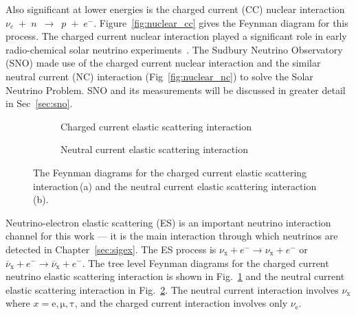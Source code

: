 Also significant at lower energies is the charged current (CC) nuclear interaction
$\nu_{e}$~$+$~$n$~$\rightarrow$~$p$~$+$~$e^{-}$.
Figure~\ref{fig:nuclear_cc} gives the Feynman diagram for this process.
The charged current nuclear interaction played a significant role in early
radio-chemical solar neutrino experiments~\cite{homestake, sage, gallex, gno}.
The Sudbury Neutrino Observatory (SNO) made use of the charged current
nuclear interaction and the similar neutral current (NC) interaction (Fig~\ref{fig:nuclear_nc})
to solve the Solar Neutrino Problem\cite{solar_nu_problem, sno_second}.
SNO and its measurements will be discussed in greater detail in Sec~\ref{sec:sno}.

\label{sec:esxsec}
\begin{figure}
\centering
\begin{subfigure}[t]{0.48\textwidth}
\centering
\begin{feynman}
\end{feynman}
\caption[Charged Current Elastic Scattering Feynman Diagram]{
Charged current elastic scattering interaction}
\label{fig:ES_CC}
\end{subfigure}
\hfill
\begin{subfigure}[t]{0.48\textwidth}
\centering
\begin{feynman}
\end{feynman}
\caption[Neutral Current Elastic Scattering Feynman Diagram]{
Neutral current elastic scattering interaction}
\label{fig:ES_NC}
\end{subfigure}
\label{fig:feynman_es}
\caption[Elastic Scattering Feynman Diagrams]{The Feynman diagrams for the
    charged current elastic scattering interaction\,(a) and the neutral
    current elastic scattering interaction\,(b).}
\end{figure}

Neutrino-electron elastic scattering (ES) is an important neutrino interaction
channel for this work --- it is the main interaction through which neutrinos are
detected in Chapter~\ref{sec:sigex}.
The ES process is $\nu_{\mathrm{x}} + e^{-} \rightarrow \nu_{\mathrm{x}} +e^{-}$
or $\overline{\nu}_{\mathrm{x}} + e^{-} \rightarrow \overline{\nu}_{\mathrm{x}} +e^{-}$.
The tree level Feynman diagrams for the charged current neutrino elastic scattering
interaction is shown in Fig.~\ref{fig:ES_CC} and the neutral current elastic
scattering interaction in Fig.~\ref{fig:ES_NC}.
The neutral current interaction involves $\nu_{\mathrm{x}}$ where $x=\mathrm{e, \mu, \tau}$,
and the charged current interaction involves only $\nu_{\mathrm{e}}$.

